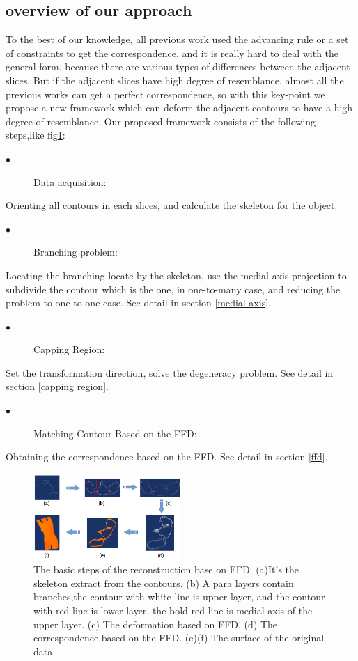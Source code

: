 \documentclass[3p,times]{elsarticle}
\begin{document}
\subsection{overview of our approach}
To the best of our knowledge, all previous work used the
advancing rule or a set of constraints to get the correspondence, and
it is really hard to deal with the general form, because there are
various types of differences between the adjacent slices. But if the adjacent
slices have high degree of resemblance, almost all the previous works can get a
perfect correspondence, so with this key-point we propose a new
framework which can deform the adjacent contours to have a high degree
of resemblance.
Our proposed framework consists of the following steps,like fig\ref{fig:fluent}:
\begin{description}
\item[$\bullet$]Data acquisition:
\end{description}
Orienting all contours in each slices, and calculate the skeleton for the object.
\begin{description}
\item[$\bullet$]Branching problem:
\end{description}
Locating the branching locate by the skeleton, use the medial axis
projection to subdivide the contour which is the one, in one-to-many
case, and reducing the problem to one-to-one case. See detail in
section \ref{medial axis}.
\begin{description}
\item[$\bullet$]Capping Region:
\end{description}
Set the transformation direction, solve the degeneracy problem. See
detail in section \ref{capping region}.

\begin{description}
\item[$\bullet$]Matching Contour Based on the FFD:
\end{description}
Obtaining the correspondence based on the FFD. See detail in section \ref{ffd}.
\begin{figure}[ht]
\centering
\includegraphics[width=0.5\textwidth]{../picture/fluent.png}
\caption{The basic steps of the reconstruction base on FFD: (a)It's
  the skeleton extract from the contours. (b) A para layers contain
  branches,the contour with white line is upper layer, and the contour
  with red line is lower layer, the bold red line is medial axis of
  the upper layer. (c) The deformation
  based on FFD. (d) The correspondence based on the FFD. (e)(f) The
  surface of the original data}
\label{fig:fluent}
\end{figure}
\end{document}
